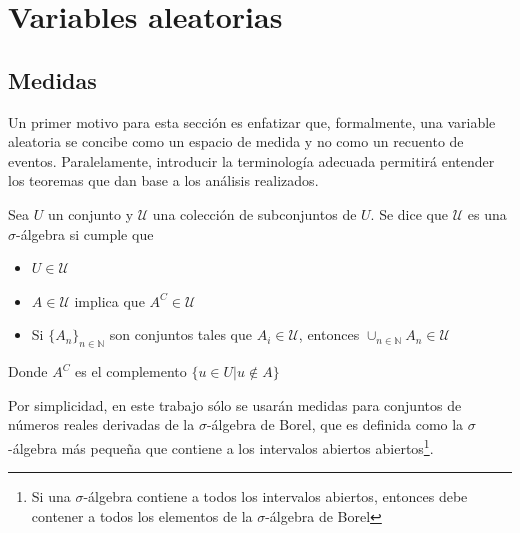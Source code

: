 
\chapter{Variables aleatorias}


\section{Medidas}

Un primer motivo para esta sección es enfatizar que, formalmente, una variable aleatoria se concibe 
como un espacio de medida y no como un recuento de eventos. 
Paralelamente, introducir la terminología adecuada permitirá entender los teoremas que dan base
a los análisis realizados.

\begin{definicion}
Sea $U$ un conjunto y $\mathcal{U}$ una colección de subconjuntos de $U$. Se dice que $\mathcal{U}$
es una $\sigma$-álgebra si cumple que
\begin{itemize}
\item $U \in \mathcal{U}$
\item $A \in \mathcal{U}$ implica que $A^{C} \in \mathcal{U}$
\item Si $\{ A_n \}_{n\in \mathbb{N}}$ son conjuntos tales que $A_i \in \mathcal{U}$, entonces
$\displaystyle \cup_{n\in \mathbb{N}} A_n \in \mathcal{U}$
\end{itemize}
Donde $A^{C}$ es el complemento $\{ u \in U | u \notin A \} $
\end{definicion}

Por simplicidad, en este trabajo sólo se usarán medidas para conjuntos de números reales derivadas 
de la $\sigma$-álgebra de Borel, que es definida como la $\sigma$-álgebra más pequeña que contiene a 
los intervalos abiertos abiertos\footnote{Si una $\sigma$-álgebra contiene a todos los
intervalos abiertos, entonces debe contener a todos los elementos de la $\sigma$-álgebra de Borel}.

